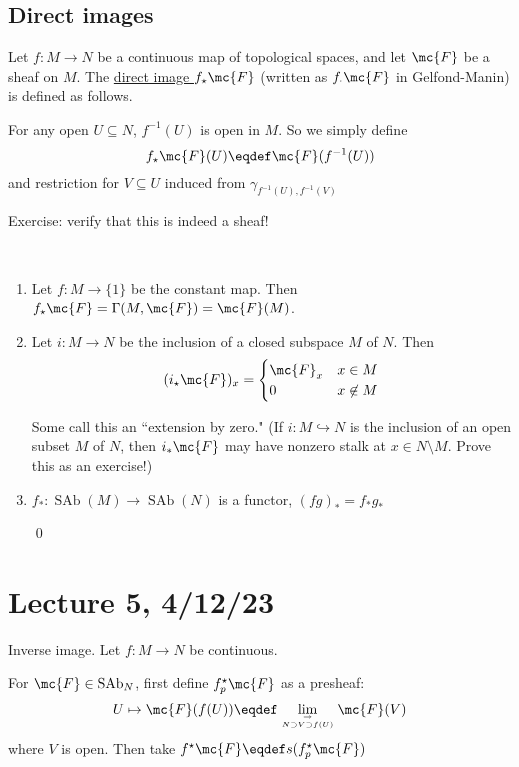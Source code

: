 \documentclass[x11names,reqno,14pt]{extarticle}
\newcommand{\into}{\hookrightarrow}
\DeclareMathOperator{\SAb}{SAb}
\begin{document}
\subsection*{Direct images}


Let $f:M\to N$ be a continuous map of topological spaces, and let $\mc{F}$ be a sheaf on $M$. The \underline{direct image $f_\star\mc{F}$} (written as $f_\cdot \mc{F}$ in Gelfond-Manin) is defined as follows. 

For any open $U \subseteq N$, $f^{-1}(U)$ is open in $M$. So we simply define
\[
f_\star\mc{F}(U) \eqdef \mc{F}(f^{-1}(U))
\]
and restriction for $V \subseteq U$ induced from $\gamma_{f^{-1}(U),f^{-1}(V)}$

Exercise: verify that this is indeed a sheaf!

\prop\,

\begin{enumerate}[label=(\alph*)]

\item Let $f:M\to\{1\}$ be the constant map. Then $f_\star\mc{F} = \Gamma(M,\mc{F}) = \mc{F}(M)$.

\item Let $i:M\to N$ be the inclusion of a closed subspace $M$ of $N$. Then
\[
(i_\star\mc{F})_x = \begin{cases} \mc{F}_x & x \in M \\ 0 & x\not\in M\end{cases}
\]

Some call this an ``extension by zero." (If $i:M\into N$ is the inclusion of an open subset $M$ of $N$, then $i_*\mc{F}$ may have nonzero stalk at $x \in N\setminus M$. Prove this as an exercise!)

\item $f_*:\SAb(M)\to\SAb(N)$ is a functor, $(fg)_* = f_* g_*$

\proof

\qed

\end{enumerate}

\section*{Lecture 5, 4/12/23}

Inverse image. Let $f:M\to N$ be continuous. 

 For $\mc{F} \in \SAb_N$, first define $f_p^\star \mc{F}$ as a presheaf:
\[
U\mapsto \mc{F}(f(U)) \eqdef \lim_{\to\atop{N \supset V \supset f(U)}}\mc{F}(V)
\]
where $V$ is open.
Then take $f^\star\mc{F} \eqdef s(f_p^\star \mc{F})$
\end{document}
